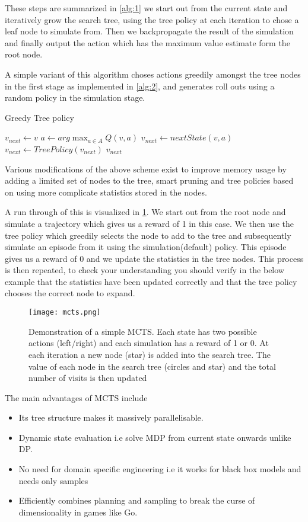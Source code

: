 \documentclass{article}
\begin{document}
These steps are summarized in \ref{alg:1} we start out from the current state and iteratively grow the search tree, using the tree policy at each iteration to chose a leaf node to simulate from. Then we backpropagate the result of the simulation and finally output the action which has the maximum value estimate form the root node.

A simple variant of this algorithm choses actions greedily amongst the tree nodes in the first stage as implemented in \ref{alg:2}, and generates roll outs using a random policy in the simulation stage. 

\begin{algorithm}
\caption{Greedy Tree policy}\label{alg:2}
\begin{algorithmic}[1]
\State $v_{next}\leftarrow v$
\State $a\leftarrow arg\max_{a\in A} Q(v,a)$
\State $v_{next} \leftarrow nextState(v,a)$
\State $v_{next}\leftarrow TreePolicy(v_{next})$
\EndIf
\Return $v_{next}$
\EndFunction
\end{algorithmic}
\end{algorithm}
Various modifications of the above scheme exist to improve memory usage by adding a limited set of nodes to the tree, smart pruning and tree policies based on using more complicate statistics stored in the nodes.\par

A run through of this is visualized in \ref{fig:mcts}. We start out from the root node and simulate a trajectory which gives us a reward of 1 in this case. We then use the tree policy which greedily selects the node to add to the tree and subsequently simulate an episode from it using the simulation(default) policy. This episode gives us a reward of 0 and we update the statistics in the tree nodes.
This process is then repeated, to check your understanding you should verify in the below example that the statistics have been updated correctly and that the tree policy chooses the correct node to expand.
\begin{figure}
\centering
\texttt{[image: mcts.png]}
\caption{Demonstration of a simple MCTS. Each state has two possible actions (left/right) and each simulation has a reward of 1 or 0. At each iteration a new node (star) is added into the search tree. The value of each node in the search tree (circles and star) and the total number of visits is then updated}
\label{fig:mcts}
\end{figure}

The main advantages of MCTS include 
\begin{itemize}
\item Its tree structure makes it massively parallelisable.
\item Dynamic state evaluation i.e solve MDP from current state onwards unlike DP.
\item No need for domain specific engineering i.e it works for black box models and needs only samples
\item Efficiently combines planning and sampling to break the curse of dimensionality in games like Go. 
\end{itemize}
\end{document}
